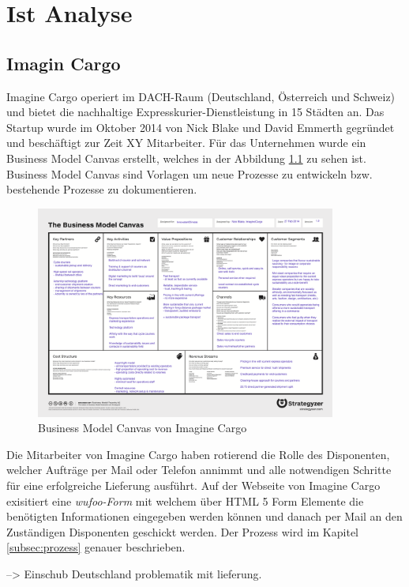 \chapter{Ist Analyse}
\label{sec:istanalyse}
\section{Imagin Cargo}
Imagine Cargo operiert im DACH-Raum (Deutschland, Österreich und Schweiz) und bietet die nachhaltige Expresskurier-Dienstleistung in 15 Städten an. Das Startup wurde im Oktober 2014 von Nick Blake und David Emmerth gegründet und beschäftigt zur Zeit XY Mitarbeiter. Für das Unternehmen wurde ein Business Model Canvas erstellt, welches in der Abbildung \ref{fig1:businessmodelcanvas} zu sehen ist. Business Model Canvas sind Vorlagen um neue Prozesse zu entwickeln bzw. bestehende Prozesse zu dokumentieren.
\begin{figure}[ht]
	\centering
  \includegraphics[width=0.88\textwidth]{images/businessModelCanvas.png}
	\caption{Business Model Canvas von Imagine Cargo}
	\label{fig1:businessmodelcanvas}
\end{figure}
 Die Mitarbeiter von Imagine Cargo haben rotierend die Rolle des Disponenten, welcher Aufträge per Mail oder Telefon annimmt und alle notwendigen Schritte für eine erfolgreiche Lieferung ausführt. Auf der Webseite von Imagine Cargo exisitiert eine \textit{wufoo-Form} mit welchem über HTML 5 Form Elemente die benötigten Informationen eingegeben werden können und danach per Mail an den Zuständigen Disponenten geschickt werden. Der Prozess wird im Kapitel \ref{subsec:prozess} genauer beschrieben.

--> Einschub Deutschland problematik mit lieferung.


